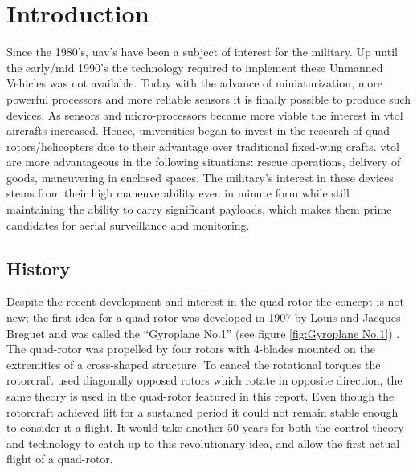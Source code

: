 


\setcounter{page}{1}

\chapter{Introduction}
Since the 1980's, {\gls{uav}}'s have been a subject of interest for the military. Up until the early/mid 1990's the technology required to implement these Unmanned Vehicles was not available. Today with the advance of miniaturization, more powerful processors and more reliable sensors it is finally possible to produce such devices. As sensors and micro-processors  became more viable the interest in \gls{vtol} aircrafts increased. Hence, universities began to invest in the research of quad-rotors/helicopters due to their advantage over traditional fixed-wing crafts. \gls{vtol} are more advantageous in the following situations: rescue operations, delivery of goods, maneuvering in enclosed spaces. The military's interest in these devices stems from their high maneuverability even in minute form while still maintaining the ability to carry significant payloads, which makes them prime candidates for aerial surveillance and monitoring.

\section{History}
Despite the recent development and interest in the quad-rotor the concept is not new; the first idea for a quad-rotor was developed in 1907 by Louis and Jacques Breguet and was called the “Gyroplane No.1” (see figure \ref{fig:Gyroplane No.1}) \cite{Principles_of_helicopter_aerodynamics}.  The quad-rotor was propelled by four rotors with 4-blades mounted on the extremities of a cross-shaped structure. To cancel the rotational torques the rotorcraft used diagonally opposed rotors which rotate in opposite direction, the same theory is used in the quad-rotor featured in this report. Even though the rotorcraft achieved lift for a sustained period it could not remain stable enough to consider it a flight. It would take another 50 years for both the control theory and technology to catch up to this revolutionary idea, and allow the first actual flight of a quad-rotor.

